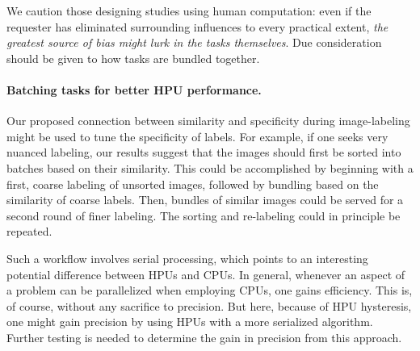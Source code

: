 \documentclass[letterpaper]{article}
\begin{document}
We caution those designing studies using human computation: even if 
the requester has eliminated surrounding influences to every practical extent, 
\textit{the greatest source of bias might lurk in the tasks themselves}.
Due consideration should be given to how tasks are bundled together.

\paragraph{Batching tasks for better HPU performance.}
Our proposed connection between similarity and specificity during 
image-labeling might be used to tune the specificity of labels.  For example,
if one seeks very nuanced labeling, our results suggest that the images 
should first be sorted into batches based on their similarity. This could be 
accomplished by beginning with a first, coarse labeling of unsorted 
images, followed by bundling based on the similarity of coarse labels. Then, 
bundles of similar images could be served for a second round of finer 
labeling.  The sorting and re-labeling could in principle be repeated.  

Such a workflow involves serial processing, which points to an interesting  
potential difference between HPUs and CPUs.  In general, whenever 
an aspect of a problem can be parallelized when employing CPUs, one gains 
efficiency.  This is, of course, without any sacrifice to precision.  
But here, because of HPU 
hysteresis, one might gain precision by using HPUs with a more serialized 
algorithm. Further testing is needed to determine the gain in precision from 
this approach.
\end{document}
